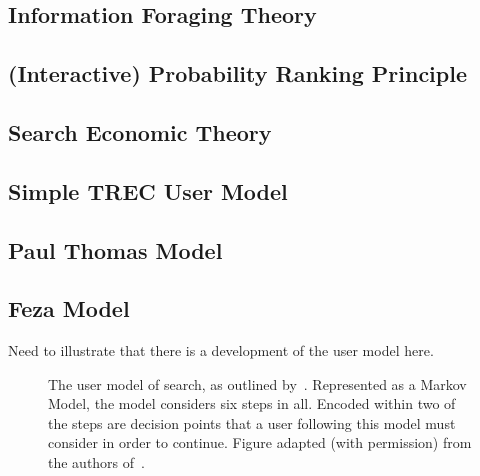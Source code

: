 \subsection{Information Foraging Theory}

\subsection{(Interactive) Probability Ranking Principle}

\subsection{Search Economic Theory}

\subsection{Simple TREC User Model}

\subsection{Paul Thomas Model}

\subsection{Feza Model}

Need to illustrate that there is a development of the user model here.

\begin{figure}[t!]
    \centering
    \caption[Model of the search process by~\cite{baskaya2013behavioural_factors}]{The user model of search, as outlined by~\citealt{baskaya2013behavioural_factors}. Represented as a Markov Model, the model considers six steps in all. Encoded within two of the steps are decision points that a user following this model must consider in order to continue. Figure adapted (with permission) from the authors of~\citealt{baskaya2013behavioural_factors}.}
    \label{fig:baskaya_model}
\end{figure}

